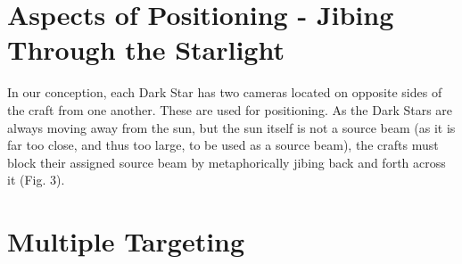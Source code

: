 \documentclass{article}
\begin{document}
\section{Aspects of Positioning - Jibing Through the Starlight}

In our conception, each Dark Star has two cameras located on opposite sides of the craft from one another. These are used for positioning. As the Dark Stars are always moving away from the sun, but the sun itself is not a source beam (as it is far too close, and thus too large, to be used as a source beam), the crafts must block their assigned source beam by metaphorically jibing back and forth across it (Fig. 3). 

\begin{figure}
    \centering
    \caption{}
    \label{fig:3_jibing}
\end{figure}

\section{Multiple Targeting}

\begin{figure}
    \centering
    \caption{}
    \label{fig:4_multitargets}
\end{figure}
\end{document}
